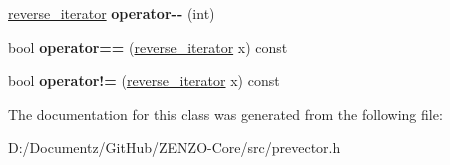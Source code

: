 \begin{DoxyCompactItemize}
\mbox{\hyperlink{classprevector_1_1reverse__iterator}{reverse\+\_\+iterator}} {\bfseries operator-\/-\/} (int)
\item 
\mbox{\label{classprevector_1_1reverse__iterator_af18719632237a298ba4145fc677b05d8}} 
bool {\bfseries operator==} (\mbox{\hyperlink{classprevector_1_1reverse__iterator}{reverse\+\_\+iterator}} x) const
\item 
\mbox{\label{classprevector_1_1reverse__iterator_ab77234832f8d03e55510a13290954ba4}} 
bool {\bfseries operator!=} (\mbox{\hyperlink{classprevector_1_1reverse__iterator}{reverse\+\_\+iterator}} x) const
\end{DoxyCompactItemize}


The documentation for this class was generated from the following file\+:\begin{DoxyCompactItemize}
\item 
D\+:/\+Documentz/\+Git\+Hub/\+Z\+E\+N\+Z\+O-\/\+Core/src/prevector.\+h\end{DoxyCompactItemize}
